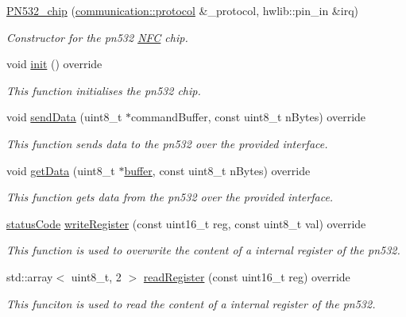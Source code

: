 \begin{DoxyCompactItemize}
\item 
\hyperlink{classnfc_1_1PN532__chip_afbdb5e54a580824290c6761db92d460e}{P\+N532\+\_\+chip} (\hyperlink{classcommunication_1_1protocol}{communication\+::protocol} \&\+\_\+protocol, hwlib\+::pin\+\_\+in \&irq)
\begin{DoxyCompactList}\small\item\em Constructor for the pn532 \hyperlink{classnfc_1_1NFC}{N\+FC} chip. \end{DoxyCompactList}\item 
void \hyperlink{classnfc_1_1PN532__chip_ab2eecf84902eedff7e7b5fae0c562804}{init} () override
\begin{DoxyCompactList}\small\item\em This function initialises the pn532 chip. \end{DoxyCompactList}\item 
void \hyperlink{classnfc_1_1PN532__chip_aab53fb1c9fced99ce154ab035f795302}{send\+Data} (uint8\+\_\+t $\ast$command\+Buffer, const uint8\+\_\+t n\+Bytes) override
\begin{DoxyCompactList}\small\item\em This function sends data to the pn532 over the provided interface. \end{DoxyCompactList}\item 
void \hyperlink{classnfc_1_1PN532__chip_ae8414552a504fec6b62ad0be140e53e0}{get\+Data} (uint8\+\_\+t $\ast$\hyperlink{classbuffer}{buffer}, const uint8\+\_\+t n\+Bytes) override
\begin{DoxyCompactList}\small\item\em This function gets data from the pn532 over the provided interface. \end{DoxyCompactList}\item 
\hyperlink{declarations_8h_ae1d20c5a38cae82ccaa6a77be3fd264b}{status\+Code} \hyperlink{classnfc_1_1PN532__chip_a2b82f8ed84c6a9b4a7f0c1ad699c13a7}{write\+Register} (const uint16\+\_\+t reg, const uint8\+\_\+t val) override
\begin{DoxyCompactList}\small\item\em This function is used to overwrite the content of a internal register of the pn532. \end{DoxyCompactList}\item 
std\+::array$<$ uint8\+\_\+t, 2 $>$ \hyperlink{classnfc_1_1PN532__chip_a7c3e596337bced5394689396d201bc13}{read\+Register} (const uint16\+\_\+t reg) override
\begin{DoxyCompactList}\small\item\em This funciton is used to read the content of a internal register of the pn532. \end{DoxyCompactList}\item 

\end{DoxyCompactItemize}
